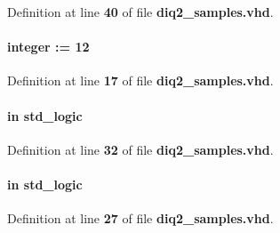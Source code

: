Definition at line {\bf 40} of file {\bf diq2\+\_\+samples.\+vhd}.

\paragraph[{diq\+\_\+width}]{ {\bfseries \textcolor{vhdlchar}{ }} {\bfseries \textcolor{comment}{integer}\textcolor{vhdlchar}{ }\textcolor{vhdlchar}{ }\textcolor{vhdlchar}{\+:}\textcolor{vhdlchar}{=}\textcolor{vhdlchar}{ }\textcolor{vhdlchar}{ } \textcolor{vhdldigit}{12} \textcolor{vhdlchar}{ }} \hspace{0.3cm}{\ttfamily [Generic]}}\label{classdiq2__samples_a72012255b2336a3619392835aa664f99}


Definition at line {\bf 17} of file {\bf diq2\+\_\+samples.\+vhd}.

\paragraph[{drct\+\_\+clk\+\_\+en}]{ {\bfseries \textcolor{keywordflow}{in}\textcolor{vhdlchar}{ }} {\bfseries \textcolor{comment}{std\+\_\+logic}\textcolor{vhdlchar}{ }} \hspace{0.3cm}{\ttfamily [Port]}}\label{classdiq2__samples_a3937d7a368bafd161602e43be8f502dd}


Definition at line {\bf 32} of file {\bf diq2\+\_\+samples.\+vhd}.

\paragraph[{en}]{ {\bfseries \textcolor{keywordflow}{in}\textcolor{vhdlchar}{ }} {\bfseries \textcolor{comment}{std\+\_\+logic}\textcolor{vhdlchar}{ }} \hspace{0.3cm}{\ttfamily [Port]}}\label{classdiq2__samples_adcf9c6f5161d039addbda5819bee64a3}


Definition at line {\bf 27} of file {\bf diq2\+\_\+samples.\+vhd}.

